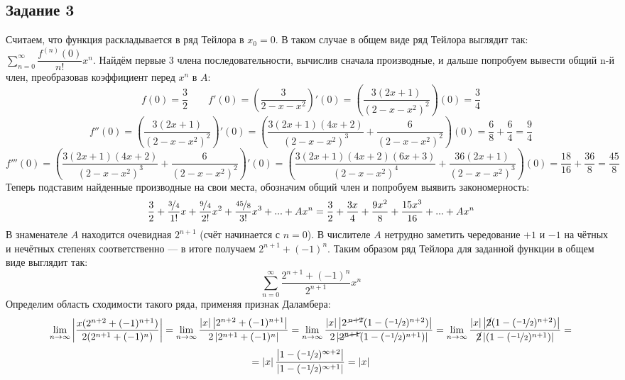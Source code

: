\documentclass{article}
\begin{document}
\subsection*{Задание 3}
Считаем, что функция раскладывается в ряд Тейлора в $x_0 = 0$. В таком случае в общем виде ряд Тейлора выглядит так: $\sum\limits_{n=0}^{\infty}\dfrac{f^{(n)}(0)}{n!}x^{n}$. Найдём первые 3 члена последовательности, вычислив сначала производные, и дальше попробуем вывести общий n-й член, преобразовав коэффициент перед $x^{n}$ в $A$:
$$f(0) = \frac{3}{2}\qquad f'(0) = \left(\frac{3}{2-x-x^2}\right)'(0) = \left(\frac{3(2x+1)}{(2-x-x^2)^2}\right)(0) = \frac{3}{4}$$
$$f''(0) = \left(\frac{3(2x+1)}{(2-x-x^2)^2}\right)'(0) = \left(\frac{3(2x+1)(4x+2)}{(2-x-x^2)^3} + \frac{6}{(2-x-x^2)^2}\right)(0) = \frac{6}{8} + \frac{6}{4} = \frac{9}{4}$$
$$f'''(0) = \left(\frac{3(2x+1)(4x+2)}{(2-x-x^2)^3} + \frac{6}{(2-x-x^2)^2}\right)'(0) = \left(\frac{3(2x+1)(4x+2)(6x+3)}{(2-x-x^2)^{4}} + \frac{36(2x+1)}{(2-x-x^2)^3}\right)(0) = \frac{18}{16}+\frac{36}{8} = \frac{45}{8}$$
Теперь подставим найденные производные на свои места, обозначим общий член и попробуем выявить закономерность:
$$\frac{3}{2} + \frac{\nicefrac{3}{4}}{1!}x + \frac{\nicefrac{9}{4}}{2!}x^{2} + \frac{\nicefrac{45}{8}}{3!}x^{3} + ... + Ax^{n} = \frac{3}{2} + \frac{3x}{4} + \frac{9x^2}{8} + \frac{15x^3}{16} + ... + Ax^{n}$$
В знаменателе $A$ находится очевидная $2^{n+1}$ (счёт начинается с $n = 0$). В числителе $A$ нетрудно заметить чередование $+1$ и $-1$ на чётных и нечётных степенях соответственно --- в итоге получаем $2^{n+1} + (-1)^{n}$. Таким образом ряд Тейлора для заданной функции в общем виде выглядит так:
$$\sum\limits_{n=0}^{\infty}\frac{2^{n+1} + (-1)^{n}}{2^{n+1}}x^{n}$$
Определим область сходимости такого ряда, применяя признак Даламбера:
$$\lim_{n\rightarrow \infty}\left\lvert \frac{x(2^{n+2}+(-1)^{n+1})}{2(2^{n+1}+(-1)^{n})}\right\rvert = \lim_{n\rightarrow \infty} \frac{\left\lvert x\right\rvert \left\lvert 2^{n+2}+(-1)^{n+1}\right\rvert }{2\left\lvert 2^{n+1}+(-1)^{n}\right\rvert } = \lim_{n\rightarrow \infty} \frac{\left\lvert x\right\rvert \left\lvert 2^{\,\cancel{n+2}}(1-(\nicefrac{-1}{2})^{n+2})\right\rvert }{2\left\lvert \cancel{2^{n+1}}(1-(\nicefrac{-1}{2})^{n+1})\right\rvert } = \lim_{n\rightarrow \infty} \frac{\left\lvert x\right\rvert \left\lvert \cancel{2}(1-(\nicefrac{-1}{2})^{n+2})\right\rvert }{\cancel{2}\left\lvert (1-(\nicefrac{-1}{2})^{n+1})\right\rvert } =$$
$$= \left\lvert x\right\rvert \frac{\left\lvert1-(\nicefrac{-1}{2})^{\infty+2}\right\rvert }{\left\lvert 1-(\nicefrac{-1}{2})^{\infty+1}\right\rvert } = \left\lvert x\right\rvert $$
\end{document}
